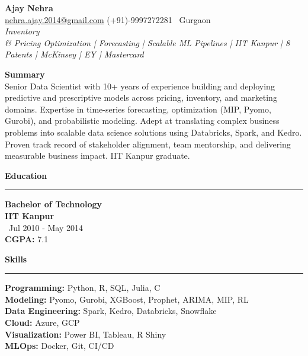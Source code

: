 \documentclass[a4paper,10pt]{article}
\begin{document}
\begin{center}
    {\LARGE \textbf{Ajay Nehra}} \\[-1mm]
    \href{mailto:nehra.ajay.2014@gmail.com}{nehra.ajay.2014@gmail.com} \hspace{5mm}
    \href{https://www.linkedin.com/in/ajay-n-575bba23/}{\faLinkedin} \hspace{5mm}
    (+91)-9997272281 \hspace{5mm}
    \faMapMarker \, Gurgaon \\
    \vspace{1mm}
    {\textit{Inventory \\& Pricing Optimization | Forecasting | Scalable ML Pipelines | IIT Kanpur | 8 Patents | McKinsey | EY | Mastercard}}
\end{center}

\vspace{1mm}
\noindent
\textbf{\large Summary} \\
Senior Data Scientist with 10+ years of experience building and deploying predictive and prescriptive models across pricing, inventory, and marketing domains. Expertise in time-series forecasting, optimization (MIP, Pyomo, Gurobi), and probabilistic modeling. Adept at translating complex business problems into scalable data science solutions using Databricks, Spark, and Kedro. Proven track record of stakeholder alignment, team mentorship, and delivering measurable business impact. IIT Kanpur graduate.

\vspace{2mm}
\begin{multicols}{2}

\textbf{\large Education} \\
\rule{\columnwidth}{0.8pt}
\textbf{Bachelor of Technology} \\
\textbf{IIT Kanpur} \\
\faCalendar \, Jul 2010 - May 2014 \\
\textbf{CGPA:} 7.1

\columnbreak

\textbf{\large Skills} \\
\rule{\columnwidth}{0.8pt}
\textbf{Programming:} Python, R, SQL, Julia, C \\
\textbf{Modeling:} Pyomo, Gurobi, XGBoost, Prophet, ARIMA, MIP, RL \\
\textbf{Data Engineering:} Spark, Kedro, Databricks, Snowflake \\
\textbf{Cloud:} Azure, GCP \\
\textbf{Visualization:} Power BI, Tableau, R Shiny \\
\textbf{MLOps:} Docker, Git, CI/CD

\end{multicols}
\end{document}
